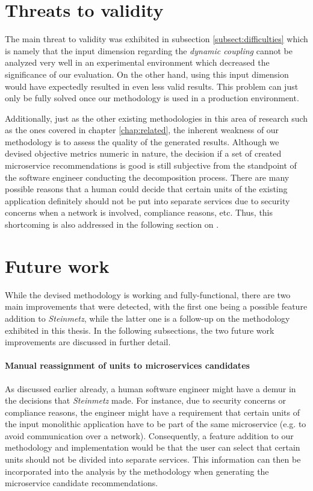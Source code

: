 \documentclass[12pt,a4paper]{report}
\begin{document}
\section{Threats to validity} \label{sect:threats-to-validity}

The main threat to validity was exhibited in subsection \ref{subsect:difficulties}
which is namely that the input dimension regarding the \textit{dynamic coupling}
cannot be analyzed very well in an experimental environment which decreased
the significance of our evaluation. On the other hand, using this input dimension
would have expectedly resulted in even less valid results. This problem can just
only be fully solved once our methodology is used in a production environment.

Additionally, just as the other existing methodologies in this area of research
such as the ones covered in chapter \ref{chap:related}, the inherent weakness
of our methodology is to assess the quality of the generated results.
Although we devised objective metrics numeric in nature, the decision if a set
of created microservice recommendations is good is still subjective from the
standpoint of the software engineer conducting the decomposition process.
There are many possible reasons that a human could decide that certain units
of the existing application definitely should not be put into separate services
due to security concerns when a network is involved, compliance reasons, etc.
Thus, this shortcoming is also addressed in the following section on
\textit{}.



\section{Future work} \label{sect:future-work}

While the devised methodology is working and fully-functional, there are two
main improvements that were detected, with the first one being a possible
feature addition to \textit{Steinmetz}, while the latter one is a follow-up
on the methodology exhibited in this thesis. In the following subsections,
the two future work improvements are discussed in further detail.

\paragraph{Manual reassignment of units to microservices candidates}
As discussed earlier already, a human software engineer might have a demur
in the decisions that \textit{Steinmetz} made. For instance, due to
security concerns or compliance reasons, the engineer might have a requirement
that certain units of the input monolithic application have to be part of
the same microservice (e.g. to avoid communication over a network).
Consequently, a feature addition to our methodology and implementation
would be that the user can select that certain units should not be divided
into separate services. This information can then be incorporated into the
analysis by the methodology when generating the microservice candidate
recommendations.
\end{document}
